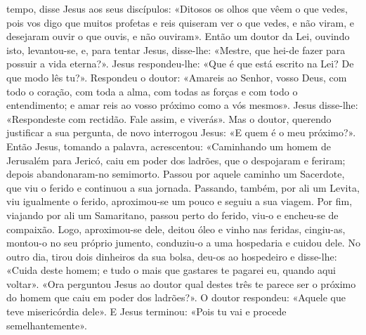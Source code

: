 \begin{paracol}{2}
{ tempo, disse Jesus aos seus discípulos: «Ditosos os olhos que vêem o que vedes, pois vos digo que muitos profetas e reis quiseram ver o que vedes, e não viram, e desejaram ouvir o que ouvis, e não ouviram». Então um doutor da Lei, ouvindo isto, levantou-se, e, para tentar Jesus, disse-lhe: «Mestre, que hei-de fazer para possuir a vida eterna?». Jesus respondeu-lhe: «Que é que está escrito na Lei? De que modo lês tu?». Respondeu o doutor: «Amareis ao Senhor, vosso Deus, com todo o coração, com toda a alma, com todas as forças e com todo o entendimento; e amar reis ao vosso próximo como a vós mesmos». Jesus disse-lhe: «Respondeste com rectidão. Fale assim, e viverás». Mas o doutor, querendo justificar a sua pergunta, de novo interrogou Jesus: «E quem é o meu próximo?». Então Jesus, tomando a palavra, acrescentou: «Caminhando um homem de Jerusalém para Jericó, caiu em poder dos ladrões, que o despojaram e feriram; depois abandonaram-no semimorto. Passou por aquele caminho um Sacerdote, que viu o ferido e continuou a sua jornada. Passando, também, por ali um Levita, viu igualmente o ferido, aproximou-se um pouco e seguiu a sua viagem. Por fim, viajando por ali um Samaritano, passou perto do ferido, viu-o e encheu-se de compaixão. Logo, aproximou-se dele, deitou óleo e vinho nas feridas, cingiu-as, montou-o no seu próprio jumento, conduziu-o a uma hospedaria e cuidou dele. No outro dia, tirou dois dinheiros da sua bolsa, deu-os ao hospedeiro e disse-lhe: «Cuida deste homem; e tudo o mais que gastares te pagarei eu, quando aqui voltar». «Ora perguntou Jesus ao doutor qual destes três te parece ser o próximo do homem que caiu em poder dos ladrões?». O doutor respondeu: «Aquele que teve misericórdia dele». E Jesus terminou: «Pois tu vai e procede semelhantemente».
}\end{paracol}

\begin{paracol}{2}\switchcolumn{}\end{paracol}

